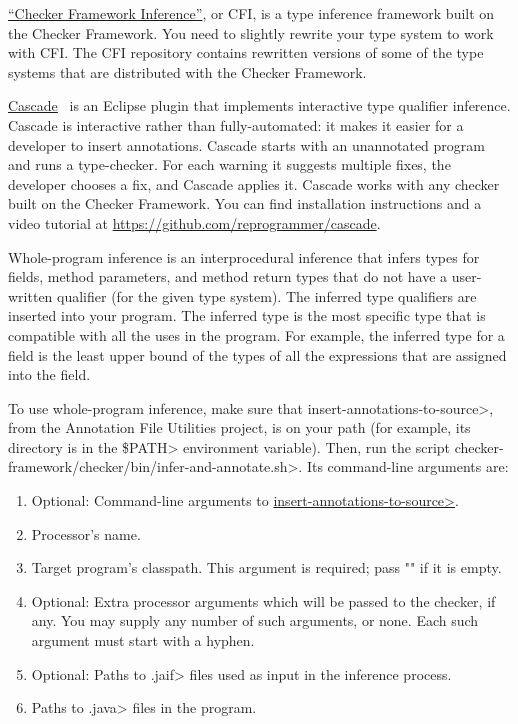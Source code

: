 \href{https://github.com/typetools/checker-framework-inference}{``Checker
  Framework Inference''}, or CFI, is a type inference framework built on
the Checker Framework.  You need to slightly rewrite your type system to
work with CFI\@.  The CFI repository contains rewritten versions of some of
the type systems that are distributed with the Checker Framework.

\href{https://github.com/reprogrammer/cascade/}{Cascade}~\cite{VakilianPEJ2014}
is an Eclipse plugin that implements interactive type qualifier inference.
Cascade is interactive rather than fully-automated:  it makes it easier for
a developer to insert annotations.
Cascade starts with an unannotated program and runs a type-checker.  For each
warning it suggests multiple fixes, the developer chooses a fix, and
Cascade applies it.  Cascade works with any checker built on the Checker
Framework.
You can find installation instructions and a video tutorial at \url{https://github.com/reprogrammer/cascade}.



Whole-program inference is an interprocedural inference that
infers types for fields, method parameters, and method return types that do not
have a user-written qualifier (for the given type system).
The inferred type qualifiers are inserted into
your program.
The inferred type is the most specific type that is compatible with all the
uses in the program.  For example, the inferred type for a field is the
least upper bound of the types of all the expressions that are assigned
into the field.

\begin{sloppypar}
To use whole-program inference, make sure that
\<insert-annotations-to-source>, from the Annotation File Utilities project,
is on your path (for example, its directory is in the \<\$PATH> environment variable).
Then, run the script \<checker-framework/checker/bin/infer-and-annotate.sh>.
Its command-line arguments are:
\end{sloppypar}

\begin{enumerate}
\item Optional: Command-line arguments to
  \href{https://checkerframework.org/annotation-file-utilities/#insert-annotations-to-source}{\<insert-annotations-to-source>}.
\item Processor's name.
\item Target program's classpath.  This argument is required; pass "" if it
  is empty.
\item Optional: Extra processor arguments which will be passed to the checker, if any.
  You may supply any number of such arguments, or none.  Each such argument
  must start with a hyphen.
\item Optional: Paths to \<.jaif> files used as input in the inference
    process.
\item Paths to \<.java> files in the program.
\end{enumerate}


